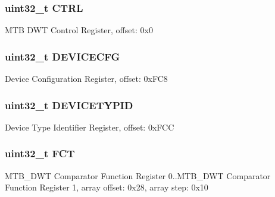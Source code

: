 \subsubsection[{C\+T\+R\+L}]{\setlength{\rightskip}{0pt plus 5cm}uint32\+\_\+t C\+T\+R\+L}\label{struct_m_t_b_d_w_t___mem_map_a3be6514ca3bd369fd0de9f8f49471179}
M\+T\+B D\+W\+T Control Register, offset\+: 0x0 \hypertarget{struct_m_t_b_d_w_t___mem_map_ad35a23bd184366d37228829c33d5bda6}{}
\subsubsection[{D\+E\+V\+I\+C\+E\+C\+F\+G}]{\setlength{\rightskip}{0pt plus 5cm}uint32\+\_\+t D\+E\+V\+I\+C\+E\+C\+F\+G}\label{struct_m_t_b_d_w_t___mem_map_ad35a23bd184366d37228829c33d5bda6}
Device Configuration Register, offset\+: 0x\+F\+C8 \hypertarget{struct_m_t_b_d_w_t___mem_map_aa736d6fbfbc7e051f6a2caadd4f17b8f}{}
\subsubsection[{D\+E\+V\+I\+C\+E\+T\+Y\+P\+I\+D}]{\setlength{\rightskip}{0pt plus 5cm}uint32\+\_\+t D\+E\+V\+I\+C\+E\+T\+Y\+P\+I\+D}\label{struct_m_t_b_d_w_t___mem_map_aa736d6fbfbc7e051f6a2caadd4f17b8f}
Device Type Identifier Register, offset\+: 0x\+F\+C\+C \hypertarget{struct_m_t_b_d_w_t___mem_map_a46e8a27d0191f1241050aeb47264ff8f}{}
\subsubsection[{F\+C\+T}]{\setlength{\rightskip}{0pt plus 5cm}uint32\+\_\+t F\+C\+T}\label{struct_m_t_b_d_w_t___mem_map_a46e8a27d0191f1241050aeb47264ff8f}
M\+T\+B\+\_\+\+D\+W\+T Comparator Function Register 0..M\+T\+B\+\_\+\+D\+W\+T Comparator Function Register 1, array offset\+: 0x28, array step\+: 0x10 \hypertarget{struct_m_t_b_d_w_t___mem_map_a33f6052ebf71e72af18f19c6edadafc4}{}
